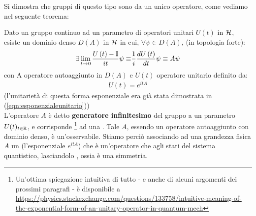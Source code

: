 \documentclass[../../FisicaTeorica.tex]{subfiles}
\begin{document}
Si dimostra che gruppi di questo tipo sono  da un unico operatore, come vediamo nel seguente teorema:
\begin{thm}
Dato un gruppo continuo ad un parametro di operatori unitari $U(t)$ in $\mathcal{H}$, esiste un dominio denso $D\left(A\right)$ in $\mathcal{H}$ in cui, $\forall \psi \in D\left(A\right)$, (in topologia forte):
\[
\exists \lim_{t\rightarrow0}{\frac{U\left(t\right)-\mathbb{I}}{it}\psi\equiv}\frac{1}{i}\frac{dU\left(t\right)}{dt}\psi \equiv A\psi
\]
con A operatore autoaggiunto in $D\left(A\right)$ e $U\left(t\right)$ operatore unitario definito da:
\begin{align*}
U(t)=e^{itA}
\end{align*}
(l'unitarietà di questa forma esponenziale era già stata dimostrata in (\ref{eqn:esponenzialeunitario}))\\
L'operatore $A$ è detto \textbf{generatore infinitesimo} del gruppo a un parametro $U(t)_{t\in\mathbb{R}}$, e corrisponde \footnote{Un'ottima spiegazione intuitiva di tutto - e anche di alcuni argomenti dei prossimi paragrafi - è disponibile a \url{https://physics.stackexchange.com/questions/133758/intuitive-meaning-of-the-exponential-form-of-an-unitary-operator-in-quantum-mech}} ad una . Tale $A$, essendo un operatore autoaggiunto con dominio denso, è un'osservabile. Stiamo perciò associando ad una grandezza fisica $A$ un  (l'esponenziale $e^{itA}$) che è un'operatore che  agli stati del sistema quantistico, lasciandolo , ossia è una simmetria.\\
\begin{comment}%
Tale risultato è analogo a uno già visto nel corso di Fisica Matematica, per cui ad ogni quantità fisica è associato un \q{flusso}, ossia un modo di trasformare le funzioni del sistema (come se usassimo l'espressione di una grandezza come hamiltoniana). Qui $A$ è un operatore che descrive un'osservabile, e l'esponenziale dell'operatore dà questo \q{flusso}. %
\end{comment}
\end{thm}
\end{document}
